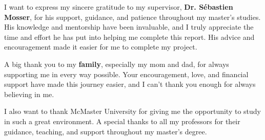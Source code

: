 
I want to express my sincere gratitude to my supervisor, \textbf{Dr. Sébastien Mosser}, for his support, guidance, and patience throughout my master’s studies. His knowledge and mentorship have been invaluable, and I truly appreciate the time and effort he has put into helping me complete this report. His advice and encouragement made it easier for me to complete my project.
\vspace{10pt}

A big thank you to my \textbf{family}, especially my mom and dad, for always supporting me in every way possible. Your encouragement, love, and financial support have made this journey easier, and I can’t thank you enough for always believing in me.
\vspace{10pt}

I also want to thank McMaster University for giving me the opportunity to study in such a great environment. A special thanks to all my professors for their guidance, teaching, and support throughout my master’s degree.